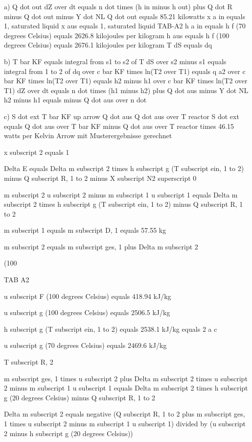 a) Q dot out  
dZ over dt equals n dot times (h in minus h out) plus Q dot R minus Q dot out minus Y dot NL  
Q dot out equals 85.21 kilowatts  
x a in equals 1, saturated liquid  
x aus equals 1, saturated liquid  
TAB-A2 h a in equals h f (70 degrees Celsius) equals 2626.8 kilojoules per kilogram  
h aus equals h f (100 degrees Celsius) equals 2676.1 kilojoules per kilogram  
T dS equals dq  

b) T bar KF equals integral from s1 to s2 of T dS over s2 minus s1 equals integral from 1 to 2 of dq over c bar KF times ln(T2 over T1) equals q a2 over c bar KF times ln(T2 over T1) equals h2 minus h1 over c bar KF times ln(T2 over T1)  
dZ over dt equals n dot times (h1 minus h2) plus Q dot aus minus Y dot NL  
h2 minus h1 equals minus Q dot aus over n dot  

c) S dot ext  
T bar KF up arrow Q dot aus  
Q dot aus over T reactor  
S dot ext equals Q dot aus over T bar KF minus Q dot aus over T reactor times 46.15 watts per Kelvin  
Arrow mit Musterergebnisse gerechnet

x subscript 2 equals 1

Delta E equals Delta m subscript 2 times h subscript g (T subscript ein, 1 to 2) minus Q subscript R, 1 to 2 minus X subscript N2 superscript 0

m subscript 2 u subscript 2 minus m subscript 1 u subscript 1 equals Delta m subscript 2 times h subscript g (T subscript ein, 1 to 2) minus Q subscript R, 1 to 2

m subscript 1 equals m subscript D, 1 equals 57.55 kg

m subscript 2 equals m subscript ges, 1 plus Delta m subscript 2

(100%

TAB A2

u subscript F (100 degrees Celsius) equals 418.94 kJ/kg

u subscript g (100 degrees Celsius) equals 2506.5 kJ/kg

h subscript g (T subscript ein, 1 to 2) equals 2538.1 kJ/kg equals 2 a c

u subscript g (70 degrees Celsius) equals 2469.6 kJ/kg

T subscript R, 2

m subscript ges, 1 times u subscript 2 plus Delta m subscript 2 times u subscript 2 minus m subscript 1 u subscript 1 equals Delta m subscript 2 times h subscript g (20 degrees Celsius) minus Q subscript R, 1 to 2

Delta m subscript 2 equals negative (Q subscript R, 1 to 2 plus m subscript ges, 1 times u subscript 2 minus m subscript 1 u subscript 1) divided by (u subscript 2 minus h subscript g (20 degrees Celsius))